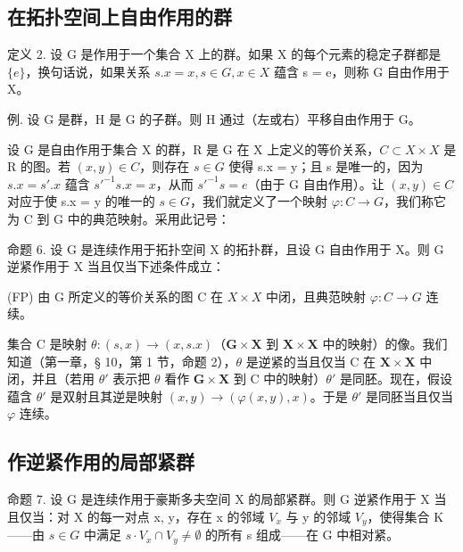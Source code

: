 \subsection{在拓扑空间上自由作用的群}

定义 2. 设 G 是作用于一个集合 X 上的群。如果 X 的每个元素的稳定子群都是 \(\{e\}\)，换句话说，如果关系 \(s.x = x, s \in G, x \in X\) 蕴含 s = e，则称 G 自由作用于 X。

例. 设 G 是群，H 是 G 的子群。则 H 通过（左或右）平移自由作用于 G。

设 G 是自由作用于集合 X 的群，R 是 G 在 X 上定义的等价关系，\(C \subset X \times X\) 是 R 的图。若 \((x, y) \in C\)，则存在 \(s \in G\) 使得 s.x = y；且 s 是唯一的，因为 \(s.x = s'.x\) 蕴含 \(s'^{-1}s.x = x\)，从而 \(s'^{-1}s = e\)（由于 G 自由作用）。让 \((x, y) \in C\) 对应于使 s.x = y 的唯一的 \(s \in G\)，我们就定义了一个映射 \(\varphi: C \to G\)，我们称它为 C 到 G 中的典范映射。采用此记号：

命题 6. 设 G 是连续作用于拓扑空间 X 的拓扑群，且设 G 自由作用于 X。则 G 逆紧作用于 X 当且仅当下述条件成立：

(FP) 由 G 所定义的等价关系的图 C 在 \(X \times X\) 中闭，且典范映射 \(\varphi: C \rightarrow G\) 连续。

集合 C 是映射 \(\theta: (s, x) \to (x, s.x)\)（\(\mathbf{G} \times \mathbf{X}\) 到 \(\mathbf{X} \times \mathbf{X}\) 中的映射）的像。我们知道（第一章，§ 10，第 1 节，命题 2），\(\theta\) 是逆紧的当且仅当 C 在 \(\mathbf{X} \times \mathbf{X}\) 中闭，并且（若用 \(\theta'\) 表示把 \(\theta\) 看作 \(\mathbf{G} \times \mathbf{X}\) 到 C 中的映射）\(\theta'\) 是同胚。现在，假设蕴含 \(\theta'\) 是双射且其逆是映射 \((x, y) \to (\varphi(x, y), x)\)。于是 \(\theta'\) 是同胚当且仅当 \(\varphi\) 连续。

\subsection{作逆紧作用的局部紧群}

命题 7. 设 G 是连续作用于豪斯多夫空间 X 的局部紧群。则 G 逆紧作用于 X 当且仅当：对 X 的每一对点 x, y，存在 x 的邻域 \(V_{x}\) 与 y 的邻域 \(V_{y}\)，使得集合 K——由 \(s \in G\) 中满足 \(s \cdot V_{x} \cap V_{y} \neq \emptyset\) 的所有 s 组成——在 G 中相对紧。

